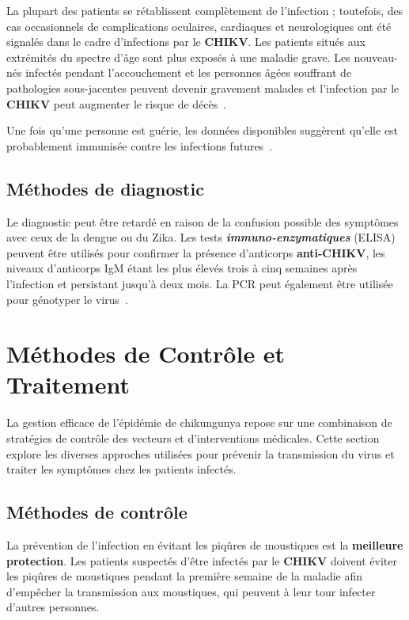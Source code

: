La plupart des patients se rétablissent complètement de l'infection ; toutefois, des cas occasionnels de complications oculaires, cardiaques et neurologiques ont été signalés dans le cadre d'infections par le \textbf{CHIKV}. Les patients situés aux extrémités du spectre d'âge sont plus exposés à une maladie grave. Les nouveau-nés infectés pendant l'accouchement et les personnes âgées souffrant de pathologies sous-jacentes peuvent devenir gravement malades et l'infection par le \textbf{CHIKV} peut augmenter le risque de décès~\cite{who2}.

Une fois qu'une personne est guérie, les données disponibles suggèrent qu'elle est probablement immunisée contre les infections futures~\cite{auerswald2018broad}.

\subsection{Méthodes de diagnostic}
Le diagnostic peut être retardé en raison de la confusion possible des symptômes avec ceux de la dengue ou du Zika. Les tests \textbf{\textit{immuno-enzymatiques}} (ELISA) peuvent être utilisés pour confirmer la présence d'anticorps \textbf{anti-CHIKV}, les niveaux d'anticorps IgM étant les plus élevés trois à cinq semaines après l'infection et persistant jusqu'à deux mois. La PCR peut également être utilisée pour génotyper le virus~\cite{JournalofVirology}.

\section{Méthodes de Contrôle et Traitement}

La gestion efficace de l'épidémie de chikungunya repose sur une combinaison de stratégies de contrôle des vecteurs et d'interventions médicales. Cette section explore les diverses approches utilisées pour prévenir la transmission du virus et traiter les symptômes chez les patients infectés.

\subsection{Méthodes de contrôle}
La prévention de l'infection en évitant les piqûres de moustiques est la \textbf{meilleure protection}. Les patients suspectés d'être infectés par le \textbf{CHIKV} doivent éviter les piqûres de moustiques pendant la première semaine de la maladie afin d'empêcher la transmission aux moustiques, qui peuvent à leur tour infecter d'autres personnes. 


